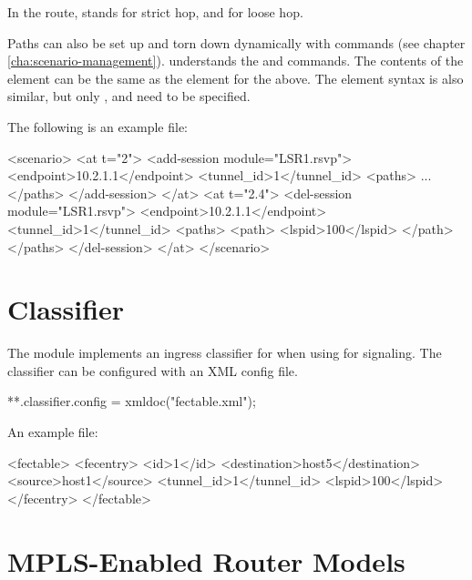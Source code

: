 In the route,  stands for strict hop, and  for loose hop.

Paths can also be set up and torn down dynamically with  
commands (see chapter \ref{cha:scenario-management}). 
 understands the  and 
 commands. The contents of the 
element can be the same as the  element for the 
above. The  element syntax is also similar, but only
,  and  need to be specified.

The following is an example  file:

\begin{XML}
<scenario>
    <at t="2">
        <add-session module="LSR1.rsvp">
            <endpoint>10.2.1.1</endpoint>
            <tunnel_id>1</tunnel_id>
            <paths>
                ...
            </paths>
        </add-session>
    </at>
    <at t="2.4">
        <del-session module="LSR1.rsvp">
            <endpoint>10.2.1.1</endpoint>
            <tunnel_id>1</tunnel_id>
            <paths>
                <path>
                    <lspid>100</lspid>
                </path>
            </paths>
        </del-session>
    </at>
</scenario>
\end{XML}

\section{Classifier}

The  module implements an ingress classifier for
 when using  for signaling. The classifier can be
configured with an XML config file.

\begin{inifile}
**.classifier.config = xmldoc("fectable.xml");
\end{inifile}

An example  file:

\begin{XML}
<fectable>
    <fecentry>
        <id>1</id>
        <destination>host5</destination>
        <source>host1</source>
        <tunnel_id>1</tunnel_id>
        <lspid>100</lspid>
    </fecentry>
</fectable>
\end{XML}
\section{MPLS-Enabled Router Models}

